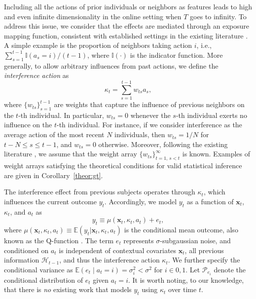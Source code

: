 \documentclass[12pt]{article}
\begin{document}
Including all the actions of prior individuals or neighbors as features leads to high and even infinite dimensionality in the online setting when $T$ goes to infinity. To address this issue, we consider that the effects are mediated through an exposure mapping function, consistent with established settings in the existing literature \citep{van2014,aronow2017,forastiere2021}. A simple example is the proportion of neighbors taking action $i$, i.e., $\sum_{s=1}^{t-1}\mathbb{I}(a_s=i)/(t-1)$, where $\mathbb{I}(\cdot)$ is the indicator function. More generally, to allow arbitrary influences from past actions, we define the \textit{interference action} as
\begin{equation}
\label{equ:kappadef}
     \kappa_t = \sum_{s=1}^{t-1} w_{ts} a_s,
\end{equation}
where $\{w_{ts}\}_{s=1}^{t-1}$ are weights that capture the influence of previous neighbors on the $t$-th individual. In particular, $w_{ts}=0$ whenever the $s$-th individual exerts no influence on the $t$-th individual. For instance, if we consider interference as the average action of the most recent $N$ individuals, then $w_{ts} = 1/N$ for $t-N \le s \le t-1$, and $w_{ts}=0$ otherwise. Moreover, following the existing literature \citep[see e.g.,][]{forastiere2021,xu2024}, we assume that the weight array $\{w_{ts}\}_{t=1,\,s<t}^{\infty}$ is known. Examples of weight arrays satisfying the theoretical conditions for valid statistical inference are given in Corollary~\ref{theor:gt}.


The interference effect from previous subjects operates through $\kappa_t$, which influences the current outcome $y_t$. Accordingly, we model $y_t$ as a function of $\bm{x}_t$, $\kappa_t$, and $a_t$ as %
\begin{equation*}
y_t \equiv \mu(\bm{x}_t,  \kappa_t, a_t)+e_t,
\end{equation*}
where $\mu(\bm{x}_t,  \kappa_t, a_t) \equiv \mathbb{E}(y_t|\bm{x}_t,  \kappa_t, a_t)$ is the conditional mean outcome, also known as the Q-function \citep{murphy2003,sutton2018}. The term $e_t$ represents $\sigma$-subgaussian noise, and conditioned on $a_t$ is independent of contextual covariates $\bm{x}_t$, all previous information $\mathcal{H}_{t-1}$, and thus the interference action $ \kappa_t$. We further specify the conditional variance as $\mathbb{E}(e_t \mid a_t = i) = \sigma_i^2 < \sigma^2$ for $i \in {0,1}$. Let $\mathcal{P}_{e_i}$ denote the conditional distribution of $e_t$ given $a_t = i$. It is worth noting, to our knowledge, that there is \textit{no} existing work that models $y_t$ using $ \kappa_t$ over time $t$.  
\end{document}
